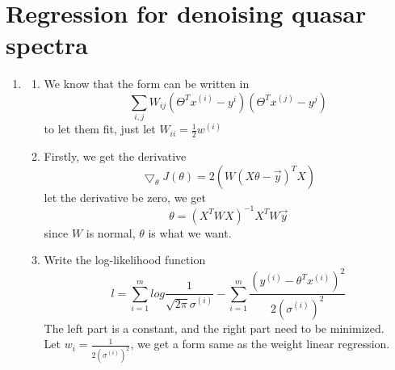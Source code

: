 \documentclass[12pt]{article}
\begin{document}
    \section*{ Regression for denoising quasar spectra}
    \begin{enumerate}[label=(\alph*)]
    
    \item
    \begin{enumerate}[label=(\roman*)]
        \item
        We know that the form can be written in
        $$ \sum_{i,j} W_{ij}(\Theta^Tx^{(i)}-y^{i})(\Theta^Tx^{(j)}-y^{j}) $$
        to let them fit, just let $W_{ii} = \frac{1}{2}w^{(i)}$
        \item
        Firstly, we get the derivative
        $$\bigtriangledown_{\theta}J(\theta) = 2(W(X\theta-\vec y)^TX)$$
        let the derivative be zero, we get
        $$ \theta =  (X^TWX)^{-1}X^TW\vec{y} $$
        since $W$ is normal, $\theta$ is what we want.
        \item
        Write the log-likelihood function
        $$ l = \sum_{i=1}^m log\frac{1}{\sqrt{2\pi}\sigma^{(i)}} 
             - \sum_{i=1}^m \frac{(y^{(i)}-\theta^Tx^{(i)})^2}{2(\sigma^{(i)})^2} $$
        The left part is a constant, and the right part need to be minimized.\\
        Let $w_{i}=\frac{1}{2(\sigma^{(i)})^2}$, we get a form same as the weight linear regression.\\
    \end{enumerate}  
    

\end{enumerate}
\end{document}

